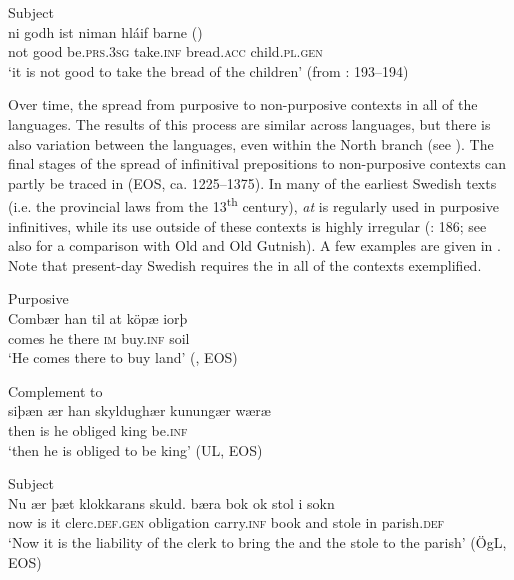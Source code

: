 \documentclass[output=paper]{langscibook}
\begin{document}
\ex Subject\\ \label{ex:kalm:3c}
\gll ni godh ist niman hláif barne ()\\
not good be.\textsc{prs.3sg} take.\textsc{inf} bread.\textsc{acc} child.\textsc{pl.gen}\\
\glt‘it is not good to take the bread of the children’ (from \citealt{Wright1954}: 193–194)
\z
\z

Over time, the  spread from purposive to non-purposive contexts in all of the  languages. The results of this process are similar across  languages, but there is also variation between the languages, even within the North  branch (see \citealt{Haspelmath1989,Los2005,Kalm2016Prepositioner, Kalm2016Satsekvivalenta,Kalm2019}). The final stages of the spread of infinitival prepositions to non-purposive contexts can partly be traced in  (EOS, ca. 1225–1375). In many of the earliest Swedish texts (i.e. the provincial laws from the 13\textsuperscript{th} century), \textit{at} is regularly used in purposive infinitives, while its use outside of these contexts is highly irregular (\citealt{Kalm2016Satsekvivalenta}: 186; see also \citealt{Kalm2019} for a comparison with Old  and Old Gutnish). A few examples are given in . Note that present-day Swedish requires the  in all of the contexts exemplified.\pagebreak


\ea
\label{ex:kalm:4}
\ea {}Purposive\\\label{ex:kalm:4a}
\gll Combær han til at köpæ iorþ\\ 
comes he there \textsc{im} buy.\textsc{inf} soil\\
\glt‘He comes there to buy land’ (, EOS) 

\ex {}Complement to \\\label{ex:kalm:4b}
\gll siþæn ær han skyldughær kunungær wæræ\\
 then is he obliged king be.\textsc{inf}\\
\glt ‘then he is obliged to be king’ (UL, EOS)
 
\ex Subject\\\label{ex:kalm:4c}
\gll Nu ær þæt klokkarans skuld. bæra bok ok stol i sokn\\
now is it clerc.\textsc{def.gen} obligation carry.\textsc{inf} book and stole in parish.\textsc{def}\\
\glt ‘Now it is the liability of the clerk to bring the  and the stole to the parish’ (ÖgL, EOS)
\z 
\z 
\end{document}
